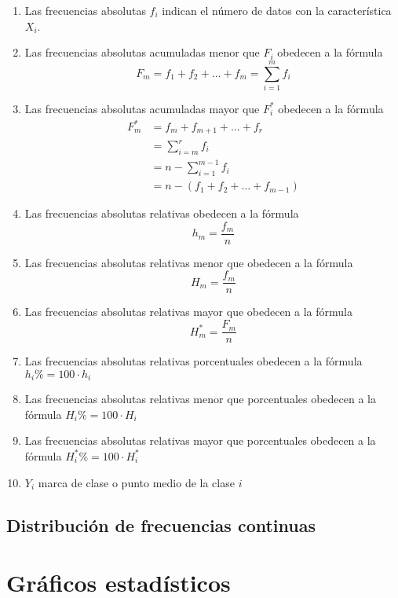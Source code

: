 \documentclass[a4paper]{report}
\begin{document}
\begin{t}
\begin{enumerate}
	\item  Las frecuencias absolutas $f_i$ indican el número de datos con la característica $X_i$.
	\item   Las frecuencias absolutas acumuladas menor que $F_i$ obedecen a la fórmula $$F_m=f_1+f_2+\ldots+f_m=\sum_{i=1}^mf_i$$
	\item   Las frecuencias absolutas acumuladas mayor que $F_i^*$ obedecen a la fórmula
	      $$
		      \begin{aligned}
			      F_m^* & =f_m+f_{m+1}+\ldots+f_r                  \\
			            & =\sum_{i=m}^rf_i                         \\
			            & =n-\sum_{i=1}^{m-1}f_i                   \\
			            & =n-\left(f_1+f_{2}+\ldots+f_{m-1}\right)
		      \end{aligned}
	      $$
	\item   Las frecuencias absolutas relativas obedecen a la fórmula $$h_m=\frac{f_m}{n}$$
	\item   Las frecuencias absolutas relativas menor que obedecen a la fórmula $$H_m=\frac{f_m}{n}$$
	\item   Las frecuencias absolutas relativas mayor que obedecen a la fórmula $$H_m^*=\frac{F_m}{n}$$
	\item   Las frecuencias absolutas relativas porcentuales obedecen a la fórmula $h_i\%=100\cdot h_i$
	\item  Las frecuencias absolutas relativas menor que porcentuales obedecen a la fórmula $H_i\%=100\cdot H_i$
	\item   Las frecuencias absolutas relativas mayor que porcentuales obedecen a la fórmula $H_i^*\%=100\cdot H_i^*$
	\item  $Y_i$ marca de clase o punto medio de la clase $i$
\end{enumerate}


\subsection{Distribución de frecuencias continuas}


\section{Gráficos estadísticos}


\end{t}
\end{document}

